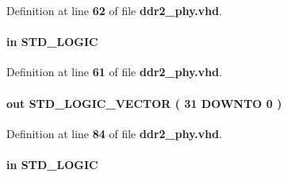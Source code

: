 Definition at line {\bf 62} of file {\bf ddr2\+\_\+phy.\+vhd}.

\paragraph[{dbg\+\_\+rd}]{ {\bfseries \textcolor{keywordflow}{in}\textcolor{vhdlchar}{ }} {\bfseries \textcolor{comment}{S\+T\+D\+\_\+\+L\+O\+G\+IC}\textcolor{vhdlchar}{ }} \hspace{0.3cm}{\ttfamily [Port]}}\label{classddr2__phy_a01739627ef0e03d1c04aafa5f9475fdb}


Definition at line {\bf 61} of file {\bf ddr2\+\_\+phy.\+vhd}.

\paragraph[{dbg\+\_\+rd\+\_\+data}]{ {\bfseries \textcolor{keywordflow}{out}\textcolor{vhdlchar}{ }} {\bfseries \textcolor{comment}{S\+T\+D\+\_\+\+L\+O\+G\+I\+C\+\_\+\+V\+E\+C\+T\+OR}\textcolor{vhdlchar}{ }\textcolor{vhdlchar}{(}\textcolor{vhdlchar}{ }\textcolor{vhdlchar}{ } \textcolor{vhdldigit}{31} \textcolor{vhdlchar}{ }\textcolor{keywordflow}{D\+O\+W\+N\+TO}\textcolor{vhdlchar}{ }\textcolor{vhdlchar}{ } \textcolor{vhdldigit}{0} \textcolor{vhdlchar}{ }\textcolor{vhdlchar}{)}\textcolor{vhdlchar}{ }} \hspace{0.3cm}{\ttfamily [Port]}}\label{classddr2__phy_a5bd1ec676b4014b660eb02868b5c137b}


Definition at line {\bf 84} of file {\bf ddr2\+\_\+phy.\+vhd}.

\paragraph[{dbg\+\_\+reset\+\_\+n}]{ {\bfseries \textcolor{keywordflow}{in}\textcolor{vhdlchar}{ }} {\bfseries \textcolor{comment}{S\+T\+D\+\_\+\+L\+O\+G\+IC}\textcolor{vhdlchar}{ }} \hspace{0.3cm}{\ttfamily [Port]}}\label{classddr2__phy_a4c05f20128535712b11570eab084f8fb}


